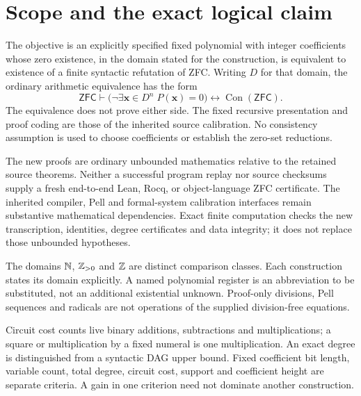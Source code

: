 \section{Scope and the exact logical claim}
The objective is an explicitly specified fixed polynomial with integer
coefficients whose zero existence, in the domain stated for the construction,
is equivalent to existence of a finite syntactic refutation of ZFC.
Writing $D$ for that domain, the ordinary arithmetic equivalence has the form
\[
 \mathsf{ZFC}\vdash
 \bigl(\neg\exists\mathbf x\in D^n\;P(\mathbf x)=0\bigr)
 \longleftrightarrow\operatorname{Con}(\mathsf{ZFC}).
\]
The equivalence does not prove either side. The fixed recursive presentation
and proof coding are those of the inherited source calibration. No consistency
assumption is used to choose coefficients or establish the zero-set reductions.

The new proofs are ordinary unbounded mathematics relative to the retained
source theorems. Neither a successful program replay nor source checksums
supply a fresh end-to-end Lean, Rocq, or object-language ZFC certificate.
The inherited compiler, Pell and formal-system calibration interfaces remain
substantive mathematical dependencies. Exact finite computation checks the
new transcription, identities, degree certificates and data integrity; it does
not replace those unbounded hypotheses.

The domains $\mathbb N$, $\mathbb Z_{>0}$ and $\mathbb Z$ are distinct comparison classes.
Each construction states its domain explicitly. A named polynomial register
is an abbreviation to be substituted, not an additional existential unknown.
Proof-only divisions, Pell sequences and radicals are not operations of the
supplied division-free equations.

Circuit cost counts live binary additions, subtractions and multiplications;
a square or multiplication by a fixed numeral is one multiplication.
An exact degree is distinguished from a syntactic DAG upper bound. Fixed
coefficient bit length, variable count, total degree, circuit cost, support
and coefficient height are separate criteria. A gain in one criterion need
not dominate another construction.
